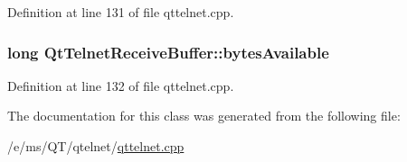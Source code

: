Definition at line 131 of file qttelnet.cpp.

\hypertarget{classQtTelnetReceiveBuffer_af9e8216d82fc5f1fc9a4aaff251b66bb}{
\subsubsection[{bytesAvailable}]{\setlength{\rightskip}{0pt plus 5cm}long {\bf QtTelnetReceiveBuffer::bytesAvailable}}}
\label{classQtTelnetReceiveBuffer_af9e8216d82fc5f1fc9a4aaff251b66bb}


Definition at line 132 of file qttelnet.cpp.



The documentation for this class was generated from the following file:\begin{DoxyCompactItemize}
\item 
/e/ms/QT/qtelnet/\hyperlink{qttelnet_8cpp}{qttelnet.cpp}\end{DoxyCompactItemize}
